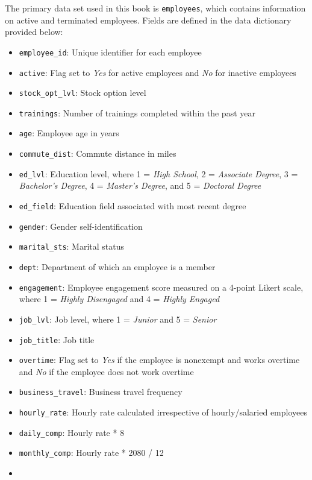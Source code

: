 \documentclass[]{book}
\providecommand{\tightlist}{%
  \setlength{\itemsep}{0pt}\setlength{\parskip}{0pt}}
\begin{document}
The primary data set used in this book is \texttt{employees}, which contains information on active and terminated employees. Fields are defined in the data dictionary provided below:

\begin{itemize}
\tightlist
\item
  \texttt{employee\_id}: Unique identifier for each employee
\item
  \texttt{active}: Flag set to \emph{Yes} for active employees and \emph{No} for inactive employees
\item
  \texttt{stock\_opt\_lvl}: Stock option level
\item
  \texttt{trainings}: Number of trainings completed within the past year
\item
  \texttt{age}: Employee age in years
\item
  \texttt{commute\_dist}: Commute distance in miles
\item
  \texttt{ed\_lvl}: Education level, where 1 = \emph{High School}, 2 = \emph{Associate Degree}, 3 = \emph{Bachelor's Degree}, 4 = \emph{Master's Degree}, and 5 = \emph{Doctoral Degree}
\item
  \texttt{ed\_field}: Education field associated with most recent degree
\item
  \texttt{gender}: Gender self-identification
\item
  \texttt{marital\_sts}: Marital status
\item
  \texttt{dept}: Department of which an employee is a member
\item
  \texttt{engagement}: Employee engagement score measured on a 4-point Likert scale, where 1 = \emph{Highly Disengaged} and 4 = \emph{Highly Engaged}
\item
  \texttt{job\_lvl}: Job level, where 1 = \emph{Junior} and 5 = \emph{Senior}
\item
  \texttt{job\_title}: Job title
\item
  \texttt{overtime}: Flag set to \emph{Yes} if the employee is nonexempt and works overtime and \emph{No} if the employee does not work overtime
\item
  \texttt{business\_travel}: Business travel frequency
\item
  \texttt{hourly\_rate}: Hourly rate calculated irrespective of hourly/salaried employees
\item
  \texttt{daily\_comp}: Hourly rate * 8
\item
  \texttt{monthly\_comp}: Hourly rate * 2080 / 12
\item

\end{itemize}
\end{document}
